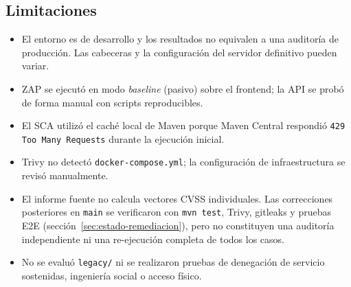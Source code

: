 \subsection{Limitaciones}

\begin{itemize}
  \item El entorno es de desarrollo y los resultados no equivalen a una auditoría
  de producción. Las cabeceras y la configuración del servidor definitivo pueden
  variar.
  \item ZAP se ejecutó en modo \textit{baseline} (pasivo) sobre el frontend; la API
  se probó de forma manual con scripts reproducibles.
  \item El SCA utilizó el caché local de Maven porque Maven Central respondió
  \texttt{429 Too Many Requests} durante la ejecución inicial.
  \item Trivy no detectó \texttt{docker-compose.yml}; la configuración de
  infraestructura se revisó manualmente.
  \item El informe fuente no calcula vectores CVSS individuales. Las correcciones
  posteriores en \texttt{main} se verificaron con \texttt{mvn test}, Trivy,
  gitleaks y pruebas E2E (sección~\ref{sec:estado-remediacion}), pero no
  constituyen una auditoría independiente ni una re-ejecución completa de todos
  los casos.
  \item No se evaluó \texttt{legacy/} ni se realizaron pruebas de denegación de
  servicio sostenidas, ingeniería social o acceso físico.
\end{itemize}

